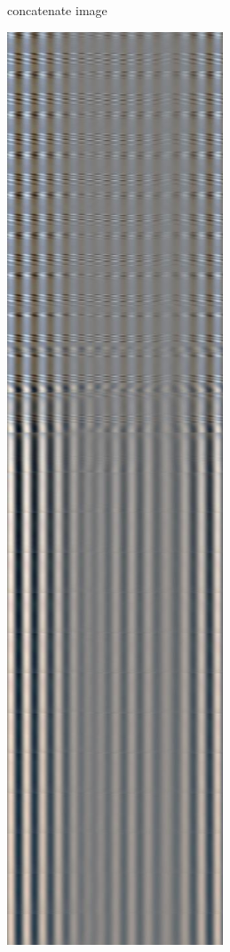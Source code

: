 \begin{figure}[!h]
\begin{subfigure}{.23\textwidth}
  \caption{concatenate image}
  \label{fig:sub2}
\end{subfigure}
\begin{subfigure}{.23\textwidth}
  \centering
  \includegraphics[scale=0.2]{img/eulerian/test/temp}

\end{subfigure}
\end{figure}
